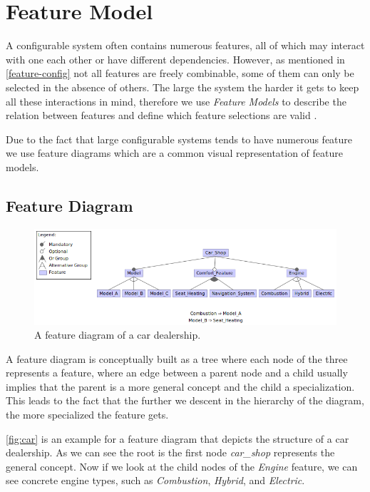 \section{Feature Model}\label{ch:Feature Model}

A configurable system often contains numerous features, all of which may interact with one each other or have different dependencies.
However, as mentioned in \autoref{feature-config} not all features are freely combinable, some of them can only be selected in the
absence of others. The large the system the harder it gets to keep all these interactions in mind, therefore we use \emph{Feature Models}
to describe the relation between features and define which feature selections are valid \cite{Feature-Oriented-Software-Product-Lines}.

Due to the fact that large configurable systems tends to have numerous feature we use feature diagrams which are a common
visual representation of feature models.

\subsection{Feature Diagram}

\begin{figure}[h]
    \centering
    \includegraphics[scale=0.6]{gfx/Car_Shop.png}
    \caption{A feature diagram of a car dealership.}
    \label{fig:car}
\end{figure}

A feature diagram is conceptually built as a tree where each node of the three represents a feature, 
where an edge between a parent node and a child usually implies that the parent is a more general concept and the child a specialization. 
This leads to the fact that the further we descent in the hierarchy of the diagram, the more specialized the feature gets.

\autoref{fig:car} is an example for a feature diagram that depicts the structure of a car dealership. As we can see the root
is the first node \textit{car\_shop} represents the general concept. Now if we look at the child nodes of the
\textit{Engine} feature, we can see concrete engine types, such as \textit{Combustion}, \textit{Hybrid}, and \textit{Electric}.

